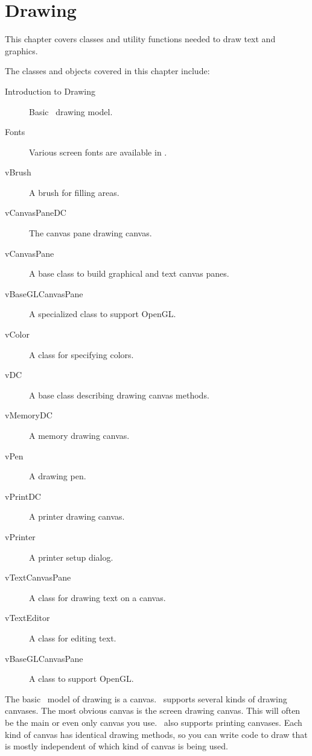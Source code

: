 \chapter {Drawing}

This chapter covers classes and utility functions needed to draw
text and graphics.

The classes and objects covered in this chapter include:

\begin{description}
	\item[Introduction to Drawing] Basic \V\ drawing model.
	\item[Fonts] Various screen fonts are available in \V\@.
	\item[vBrush] A brush for filling areas.
	\item[vCanvasPaneDC] The canvas pane drawing canvas.
	\item[vCanvasPane] A base class to build graphical and text canvas panes.
	\item[vBaseGLCanvasPane] A specialized class to support OpenGL.
	\item[vColor] A class for specifying colors.
	\item[vDC] A base class describing drawing canvas methods.
	\item[vMemoryDC] A memory drawing canvas.
	\item[vPen] A drawing pen.
	\item[vPrintDC] A printer drawing canvas.
	\item[vPrinter] A printer setup dialog.
	\item[vTextCanvasPane] A class for drawing text on a canvas. 
	\item[vTextEditor] A class for editing text.
	\item[vBaseGLCanvasPane] A class to support OpenGL.
\end{description}


The basic \V\ model of drawing is a canvas. \V\ supports several kinds
of drawing canvases. The most obvious canvas is the screen drawing canvas.
This will often be the main or even only canvas you use. \V\ also
supports printing canvases. Each kind of canvas has identical drawing
methods, so you can write code to draw that is mostly independent of
which kind of canvas is being used.

